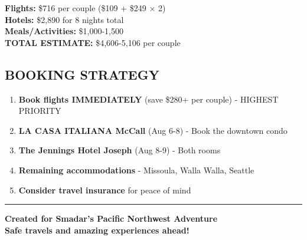 \documentclass[
  11pt,
]{article}
\providecommand{\tightlist}{%
  \setlength{\itemsep}{0pt}\setlength{\parskip}{0pt}}
\begin{document}
\textbf{\textcolor{primary}{Flights:}} \$716 per couple (\$109 + \$249 ×
2)\\
\textbf{\textcolor{primary}{Hotels:}} \$2,890 for 8 nights total\\
\textbf{\textcolor{primary}{Meals/Activities:}} \$1,000-1,500\\
\textbf{\textcolor{primary}{TOTAL ESTIMATE:}} \$4,606-5,106 per couple

\subsection{\texorpdfstring{\textcolor{secondary}{BOOKING STRATEGY}}{}}\label{section-57}

\begin{enumerate}
\def\labelenumi{\arabic{enumi}.}
\tightlist
\item
  \textbf{\textcolor{primary}{Book flights IMMEDIATELY}} (save \$280+
  per couple) - HIGHEST PRIORITY
\item
  \textbf{\textcolor{primary}{LA CASA ITALIANA McCall}} (Aug 6-8) - Book
  the downtown condo\\
\item
  \textbf{\textcolor{primary}{The Jennings Hotel Joseph}} (Aug 8-9) -
  Both rooms\\
\item
  \textbf{\textcolor{primary}{Remaining accommodations}} - Missoula,
  Walla Walla, Seattle\\
\item
  \textbf{\textcolor{primary}{Consider travel insurance}} for peace of
  mind
\end{enumerate}

\begin{center}\rule{0.5\linewidth}{0.5pt}\end{center}

\textbf{\textcolor{primary}{Created for Smadar's Pacific Northwest Adventure}}\\
\textbf{\textcolor{secondary}{Safe travels and amazing experiences ahead!}}
\end{document}
